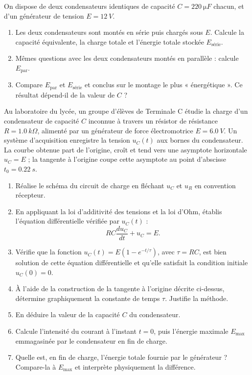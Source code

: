 \documentclass[11pt]{article}
\newcounter{popsec}
\newcounter{popsub}
\newcommand{\courssub}[1]{%
  \stepcounter{popsub}%
  \par\vspace{9pt}\noindent{\popxbold\fontsize{11.5}{13}\selectfont\color{popink}{\color{poporange}\thepopsec.\thepopsub}\hspace{6pt}#1}\par\nopagebreak\vspace{4pt}
}
\begin{document}
\begin{exercice}
On dispose de deux condensateurs identiques de capacité $C = \SI{220}{\micro F}$ chacun, et d'un générateur de tension $E = \SI{12}{V}$.
\begin{enumerate}
\item Les deux condensateurs sont montés en série puis chargés sous $E$. Calcule la capacité équivalente, la charge totale et l'énergie totale stockée $E_{\text{série}}$.
\item Mêmes questions avec les deux condensateurs montés en parallèle : calcule $E_{\text{par}}$.
\item Compare $E_{\text{par}}$ et $E_{\text{série}}$ et conclus sur le montage le plus « énergétique ». Ce résultat dépend-il de la valeur de $C$ ?
\end{enumerate}
\end{exercice}

\courssub{Je me prépare au Bac}

\begin{exercice}
Au laboratoire du lycée, un groupe d'élèves de Terminale C étudie la charge d'un condensateur de capacité $C$ inconnue à travers un résistor de résistance $R = \SI{1,0}{k\Omega}$, alimenté par un générateur de force électromotrice $E = \SI{6,0}{V}$. Un système d'acquisition enregistre la tension $u_C(t)$ aux bornes du condensateur. La courbe obtenue part de l'origine, croît et tend vers une asymptote horizontale $u_C = E$ ; la tangente à l'origine coupe cette asymptote au point d'abscisse $t_0 = \SI{0,22}{s}$.
\begin{enumerate}
\item Réalise le schéma du circuit de charge en fléchant $u_C$ et $u_R$ en convention récepteur.
\item En appliquant la loi d'additivité des tensions et la loi d'Ohm, établis l'équation différentielle vérifiée par $u_C(t)$ :
\[ R C \dfrac{d u_C}{dt} + u_C = E. \]
\item Vérifie que la fonction $u_C(t) = E\left(1 - e^{-t/\tau}\right)$, avec $\tau = RC$, est bien solution de cette équation différentielle et qu'elle satisfait la condition initiale $u_C(0) = 0$.
\item À l'aide de la construction de la tangente à l'origine décrite ci-dessus, détermine graphiquement la constante de temps $\tau$. Justifie la méthode.
\item En déduire la valeur de la capacité $C$ du condensateur.
\item Calcule l'intensité du courant à l'instant $t = 0$, puis l'énergie maximale $E_{\max}$ emmagasinée par le condensateur en fin de charge.
\item Quelle est, en fin de charge, l'énergie totale fournie par le générateur ? Compare-la à $E_{\max}$ et interprète physiquement la différence.
\end{enumerate}
\end{exercice}
\end{document}
